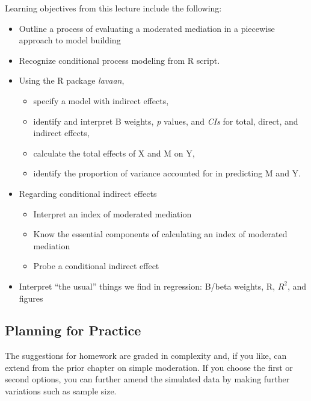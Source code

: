 \documentclass[
  11pt,
]{book}
\providecommand{\tightlist}{%
  \setlength{\itemsep}{0pt}\setlength{\parskip}{0pt}}
\begin{document}
Learning objectives from this lecture include the following:

\begin{itemize}
\tightlist
\item
  Outline a process of evaluating a moderated mediation in a piecewise \citep{hayes_introduction_2018} approach to model building
\item
  Recognize conditional process modeling from R script.
\item
  Using the R package \emph{lavaan},

  \begin{itemize}
  \tightlist
  \item
    specify a model with indirect effects,
  \item
    identify and interpret B weights, \emph{p} values, and \emph{CIs} for total, direct, and indirect effects,\\
  \item
    calculate the total effects of X and M on Y,
  \item
    identify the proportion of variance accounted for in predicting M and Y.
  \end{itemize}
\item
  Regarding conditional indirect effects

  \begin{itemize}
  \tightlist
  \item
    Interpret an index of moderated mediation
  \item
    Know the essential components of calculating an index of moderated mediation
  \item
    Probe a conditional indirect effect
  \end{itemize}
\item
  Interpret ``the usual'' things we find in regression: B/beta weights, R, \(R^{2}\), and figures
\end{itemize}

\hypertarget{planning-for-practice-7}{%
\subsection{Planning for Practice}\label{planning-for-practice-7}}

The suggestions for homework are graded in complexity and, if you like, can extend from the prior chapter on simple moderation. If you choose the first or second options, you can further amend the simulated data by making further variations such as sample size.
\end{document}
